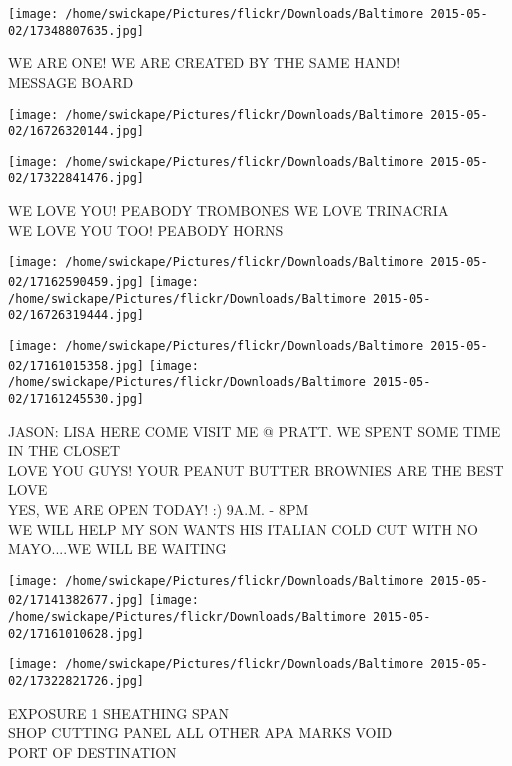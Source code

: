 \documentclass[10pt,letterpaper]{article}
\begin{document}
\vspace{0.25in}
\texttt{[image: /home/swickape/Pictures/flickr/Downloads/Baltimore 2015-05-02/17348807635.jpg]}

WE ARE ONE!  WE ARE CREATED BY THE SAME HAND!\\
MESSAGE BOARD\\
\pagebreak

\texttt{[image: /home/swickape/Pictures/flickr/Downloads/Baltimore 2015-05-02/16726320144.jpg]}

\vspace{0.25in}
\texttt{[image: /home/swickape/Pictures/flickr/Downloads/Baltimore 2015-05-02/17322841476.jpg]}

WE LOVE YOU!  PEABODY TROMBONES WE LOVE TRINACRIA\\
WE LOVE YOU TOO!  PEABODY HORNS\\
\pagebreak

\texttt{[image: /home/swickape/Pictures/flickr/Downloads/Baltimore 2015-05-02/17162590459.jpg]}
\texttt{[image: /home/swickape/Pictures/flickr/Downloads/Baltimore 2015-05-02/16726319444.jpg]}

\texttt{[image: /home/swickape/Pictures/flickr/Downloads/Baltimore 2015-05-02/17161015358.jpg]}
\texttt{[image: /home/swickape/Pictures/flickr/Downloads/Baltimore 2015-05-02/17161245530.jpg]}

JASON: LISA HERE COME VISIT ME @ PRATT.  WE SPENT SOME TIME IN THE CLOSET\\
LOVE YOU GUYS!  YOUR PEANUT BUTTER BROWNIES ARE THE BEST LOVE\\
YES, WE ARE OPEN TODAY! :)  9A.M. {-} 8PM\\
WE WILL HELP MY SON WANTS HIS ITALIAN COLD CUT WITH NO MAYO....WE WILL BE WAITING\\
\pagebreak

\texttt{[image: /home/swickape/Pictures/flickr/Downloads/Baltimore 2015-05-02/17141382677.jpg]}
\texttt{[image: /home/swickape/Pictures/flickr/Downloads/Baltimore 2015-05-02/17161010628.jpg]}

\texttt{[image: /home/swickape/Pictures/flickr/Downloads/Baltimore 2015-05-02/17322821726.jpg]}

EXPOSURE 1 SHEATHING SPAN\\
SHOP CUTTING PANEL ALL OTHER APA MARKS VOID\\
PORT OF DESTINATION\\
\pagebreak
\end{document}
